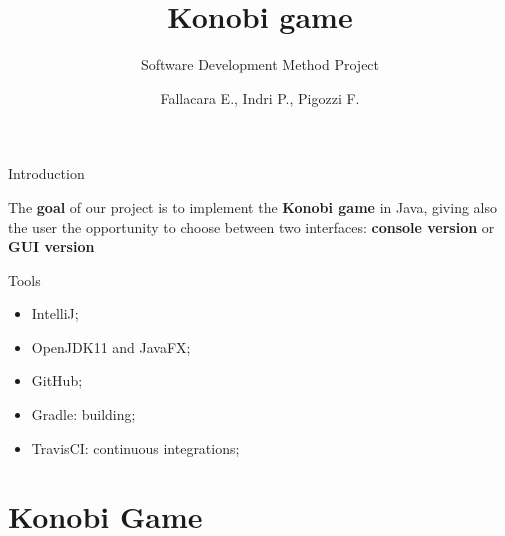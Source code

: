 \documentclass{beamer}
\title{Konobi game}
\subtitle{Software Development Method Project}
\author{Fallacara E., Indri P., Pigozzi F.}
\date{}
\begin{document}
	\setcounter{showSlideNumbers}{0}

	\frame{\titlepage}

	\setcounter{framenumber}{0}
	\setcounter{showSlideNumbers}{1}

  

  \begin{frame}{Introduction}

    \begin{tcolorbox}[colback=red!90!black!10]
      The \textbf{goal} of our project is to implement the \textbf{Konobi game} in Java, giving also the user the opportunity to choose between two interfaces: \textbf{console version} or \textbf{GUI version}
    \end{tcolorbox}

    \vspace{1em}

    \begin{block}{Tools}
      \begin{itemize}
      \item IntelliJ;
        \item OpenJDK11 and JavaFX;
        \item GitHub;
        \item Gradle: building;
        \item TravisCI: continuous integrations;
      \end{itemize}
    \end{block}

  \end{frame}


\section{Konobi Game}
\end{document}
